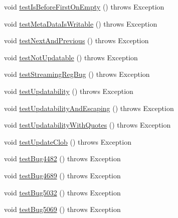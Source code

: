\begin{DoxyCompactItemize}
void \mbox{\hyperlink{classtestsuite_1_1regression_1_1_result_set_regression_test_a45914f0b82f48f8d02b3660bf7b39a8b}{test\+Is\+Before\+First\+On\+Empty}} ()  throws Exception 
\item 
void \mbox{\hyperlink{classtestsuite_1_1regression_1_1_result_set_regression_test_a6dcc88835bfc825c76f2b561299ba5ae}{test\+Meta\+Data\+Is\+Writable}} ()  throws Exception 
\item 
void \mbox{\hyperlink{classtestsuite_1_1regression_1_1_result_set_regression_test_a0c13a2fe761dffa7df042ede36d977f4}{test\+Next\+And\+Previous}} ()  throws Exception 
\item 
void \mbox{\hyperlink{classtestsuite_1_1regression_1_1_result_set_regression_test_a87b5a0b26c6031bfbaef6527e26abb40}{test\+Not\+Updatable}} ()  throws Exception 
\item 
void \mbox{\hyperlink{classtestsuite_1_1regression_1_1_result_set_regression_test_aa4e05afadbebf3dfcb1ab53ba94e8787}{test\+Streaming\+Reg\+Bug}} ()  throws Exception 
\item 
void \mbox{\hyperlink{classtestsuite_1_1regression_1_1_result_set_regression_test_aee16c849b12feacaadefbdb6c6eb2052}{test\+Updatability}} ()  throws Exception 
\item 
void \mbox{\hyperlink{classtestsuite_1_1regression_1_1_result_set_regression_test_a1f3b74a37f6cd750d879cd56514a2b71}{test\+Updatability\+And\+Escaping}} ()  throws Exception 
\item 
void \mbox{\hyperlink{classtestsuite_1_1regression_1_1_result_set_regression_test_a7b168ae8bd5196ba9aa966cf407b37a3}{test\+Updatability\+With\+Quotes}} ()  throws Exception 
\item 
void \mbox{\hyperlink{classtestsuite_1_1regression_1_1_result_set_regression_test_a996b8a0a196360051ed54e9ccc044c92}{test\+Update\+Clob}} ()  throws Exception 
\item 
void \mbox{\hyperlink{classtestsuite_1_1regression_1_1_result_set_regression_test_adb7d4f5375bd8e7ac8f4cc267e818fea}{test\+Bug4482}} ()  throws Exception 
\item 
void \mbox{\hyperlink{classtestsuite_1_1regression_1_1_result_set_regression_test_a57d92d98b7d1e7401db796d58e650a2b}{test\+Bug4689}} ()  throws Exception 
\item 
void \mbox{\hyperlink{classtestsuite_1_1regression_1_1_result_set_regression_test_a647daf219a6f3bba85706fa0aad0ca76}{test\+Bug5032}} ()  throws Exception 
\item 
void \mbox{\hyperlink{classtestsuite_1_1regression_1_1_result_set_regression_test_a3fc2285158514cb2ab7dcc1e3880113b}{test\+Bug5069}} ()  throws Exception 

\end{DoxyCompactItemize}
